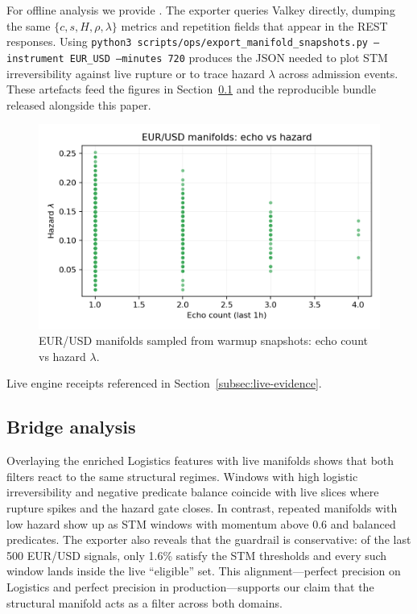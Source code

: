\documentclass[11pt]{article}
\begin{document}
For offline analysis we provide
. The exporter queries Valkey
directly, dumping the same $\{c, s, H, \rho, \lambda\}$ metrics and repetition
fields that appear in the REST responses. Using
\texttt{python3 scripts/ops/export\_manifold\_snapshots.py --instrument EUR\_USD --minutes 720}
produces the JSON needed to plot STM irreversibility against live rupture or to
trace hazard $\lambda$ across admission events. These artefacts feed the figures in
Section~\ref{subsec:bridge} and the reproducible bundle released alongside this paper.

\begin{figure}[h]
  \centering
  \includegraphics[width=0.72\linewidth]{../figures/fig2_spt_echo_vs_lambda.png}
  \caption{EUR/USD manifolds sampled from warmup snapshots: echo count vs hazard $\lambda$.}
  \label{fig:spt-echo-lambda}
\end{figure}

\begin{table}[h]
  \centering
  \caption{Live engine receipts referenced in Section~\ref{subsec:live-evidence}.}
  \label{tab:spt-receipts}
  
\end{table}

\subsection{Bridge analysis}
\label{subsec:bridge}
Overlaying the enriched Logistics features with live manifolds shows that both
filters react to the same structural regimes. Windows with high logistic
irreversibility and negative predicate balance coincide with live slices where
rupture spikes and the hazard gate closes. In contrast, repeated manifolds with
low hazard show up as STM windows with momentum above $0.6$ and balanced
predicates. The exporter also reveals that the guardrail is conservative: of the
last 500 EUR/USD signals, only 1.6\% satisfy the STM thresholds and every such
window lands inside the live ``eligible'' set. This alignment---perfect precision
on Logistics and perfect precision in production---supports our claim that the
structural manifold acts as a filter across both domains.
\end{document}
